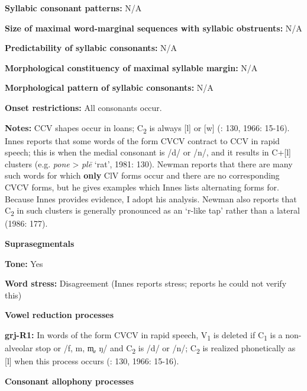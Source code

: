 \textbf{Syllabic consonant patterns:} N/A



\textbf{Size of maximal word{}-marginal sequences with syllabic obstruents:} N/A



\textbf{Predictability of syllabic consonants:} N/A



\textbf{Morphological constituency of maximal syllable margin:} N/A



\textbf{Morphological pattern of syllabic consonants:} N/A



\textbf{Onset restrictions:} All consonants occur.



\textbf{Notes:} CCV shapes occur in loans; C\textsubscript{2} is always [l] or [w] (\citealt{Innes1981}: 130, 1966: 15-16). Innes reports that some words of the form CVCV contract to CCV in rapid speech; this is when the medial consonant is /d/ or /n/, and it results in C+[l] clusters (e.g. \textit{pone} > \textit{plē} ‘rat’, 1981: 130). Newman reports that there are many such words for which \textbf{only} ClV forms occur and there are no corresponding CVCV forms, but he gives examples which Innes lists alternating forms for. Because Innes provides evidence, I adopt his analysis. Newman also reports that C\textsubscript{2} in such clusters is generally pronounced as an ‘r-like tap’ rather than a lateral (1986: 177).



\textbf{Suprasegmentals}



\textbf{Tone:} Yes



\textbf{Word stress:} Disagreement (Innes reports stress; \citealt{Newman1986} reports he could not verify this)



\textbf{Vowel reduction processes}



\textbf{grj-R1:} In words of the form CVCV in rapid speech, V\textsubscript{1} is deleted if C\textsubscript{1} is a non-alveolar stop or /f, m, m̥, ŋ/ and C\textsubscript{2} is /d/ or /n/; C\textsubscript{2} is realized phonetically as [l] when this process occurs (\citealt{Innes1981}: 130, 1966: 15-16).



\textbf{Consonant allophony processes}



